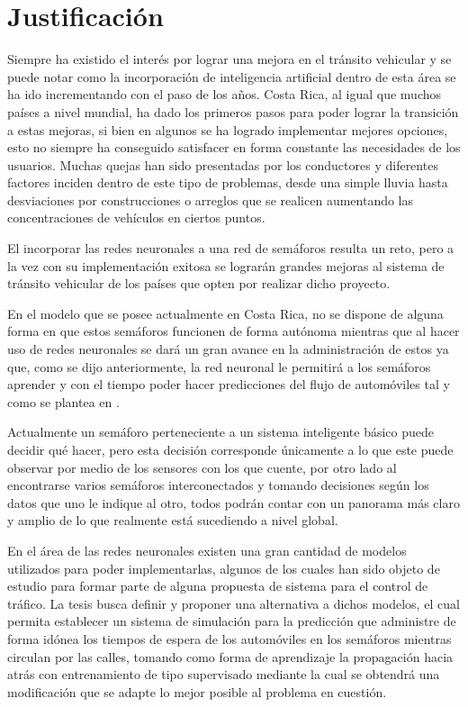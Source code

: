 \section{Justificaci\'{o}n}

		
		Siempre ha existido el inter\'{e}s por lograr una mejora en el tr\'{a}nsito vehicular
	y se puede notar como la incorporaci\'{o}n de inteligencia artificial dentro de esta
	\'{a}rea  se ha ido incrementando con el paso de los a\~{n}os. Costa Rica, al
	igual que muchos pa\'{i}ses a nivel mundial, ha dado los primeros pasos para
	poder lograr la transici\'{o}n a estas mejoras, si bien en algunos se ha
	logrado implementar mejores opciones, esto no siempre ha conseguido satisfacer en forma constante las necesidades de los usuarios. Muchas quejas han sido
	presentadas por los conductores y diferentes factores inciden dentro de este
	tipo de problemas, desde una simple lluvia hasta desviaciones por construcciones o arreglos que se realicen aumentando las concentraciones de veh\'{i}culos en ciertos puntos.\cite{Fallas2007}
	
		El incorporar las redes neuronales a una red de sem\'{a}foros resulta un reto,
	pero a la vez con su implementaci\'{o}n exitosa se lograr\'{a}n grandes mejoras al sistema
	de tr\'{a}nsito vehicular de los pa\'{i}ses que opten por realizar dicho proyecto.
	
		En el modelo que se posee actualmente en Costa Rica, no se dispone de alguna
	forma en que estos sem\'{a}foros funcionen de forma aut\'{o}noma mientras que al hacer
	uso de redes neuronales se dar\'{a} un gran avance en la administraci\'{o}n de estos ya
	que, como se dijo anteriormente, la red neuronal le permitir\'{a} a los
	sem\'{a}foros aprender y con el tiempo poder hacer predicciones del flujo de
	autom\'{o}viles tal y como se plantea en \cite{Gilmore1993}.
	
		Actualmente un sem\'{a}foro perteneciente a un sistema inteligente b\'{a}sico puede
	decidir qu\'{e} hacer, pero esta decisi\'{o}n corresponde \'{u}nicamente a lo que este
	puede observar por medio de los sensores con los que cuente, por otro lado al
	encontrarse varios sem\'{a}foros interconectados y tomando decisiones seg\'{u}n los datos que uno le indique al otro, todos podr\'{a}n contar con un panorama m\'{a}s claro y amplio de lo que realmente est\'{a} sucediendo a nivel global.
	
		En el \'{a}rea de las redes neuronales existen una gran cantidad de modelos
	utilizados para poder implementarlas, algunos de los cuales han sido objeto de
	estudio para formar parte de alguna propuesta de sistema para el control de
	tr\'{a}fico. La tesis busca definir y  proponer una alternativa a dichos
	modelos, el cual permita establecer un sistema de simulaci\'{o}n para la
	predicci\'{o}n que administre de forma id\'{o}nea los tiempos de espera de los
	autom\'{o}viles en los sem\'{a}foros mientras circulan por las calles, tomando como forma de aprendizaje la propagaci\'{o}n hacia atr\'{a}s con entrenamiento de tipo supervisado mediante la cual se obtendr\'{a} una modificaci\'{o}n que se adapte lo mejor posible al problema en cuesti\'{o}n.
	
